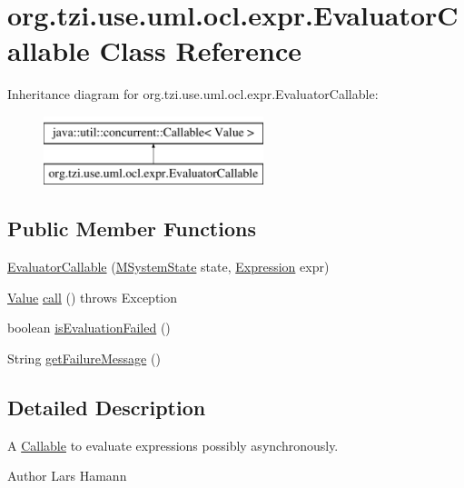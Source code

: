 \hypertarget{classorg_1_1tzi_1_1use_1_1uml_1_1ocl_1_1expr_1_1_evaluator_callable}{\section{org.\-tzi.\-use.\-uml.\-ocl.\-expr.\-Evaluator\-Callable Class Reference}
\label{classorg_1_1tzi_1_1use_1_1uml_1_1ocl_1_1expr_1_1_evaluator_callable}
}
Inheritance diagram for org.\-tzi.\-use.\-uml.\-ocl.\-expr.\-Evaluator\-Callable\-:\begin{figure}[H]
\begin{center}
\leavevmode
\includegraphics[height=2.000000cm]{classorg_1_1tzi_1_1use_1_1uml_1_1ocl_1_1expr_1_1_evaluator_callable}
\end{center}
\end{figure}
\subsection*{Public Member Functions}
\begin{DoxyCompactItemize}
\item 
\hyperlink{classorg_1_1tzi_1_1use_1_1uml_1_1ocl_1_1expr_1_1_evaluator_callable_a980e45db3ab0e22c953871edbefc42ca}{Evaluator\-Callable} (\hyperlink{classorg_1_1tzi_1_1use_1_1uml_1_1sys_1_1_m_system_state}{M\-System\-State} state, \hyperlink{classorg_1_1tzi_1_1use_1_1uml_1_1ocl_1_1expr_1_1_expression}{Expression} expr)
\item 
\hyperlink{classorg_1_1tzi_1_1use_1_1uml_1_1ocl_1_1value_1_1_value}{Value} \hyperlink{classorg_1_1tzi_1_1use_1_1uml_1_1ocl_1_1expr_1_1_evaluator_callable_acb68178c8f2f477ab0c930d484df9ed9}{call} ()  throws Exception 
\item 
boolean \hyperlink{classorg_1_1tzi_1_1use_1_1uml_1_1ocl_1_1expr_1_1_evaluator_callable_ad1379f250b7d86584ebe3cfac803c936}{is\-Evaluation\-Failed} ()
\item 
String \hyperlink{classorg_1_1tzi_1_1use_1_1uml_1_1ocl_1_1expr_1_1_evaluator_callable_aa7a1059a9cd37212b5fadb20e4916fdd}{get\-Failure\-Message} ()
\end{DoxyCompactItemize}


\subsection{Detailed Description}
A \hyperlink{}{Callable} to evaluate expressions possibly asynchronously. \begin{DoxyAuthor}{Author}
Lars Hamann 
\end{DoxyAuthor}


